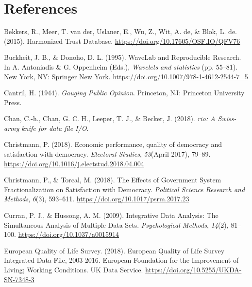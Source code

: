 \documentclass[12pt,]{article}
\begin{document}
\normalsize

\hypertarget{references}{%
\section{References}\label{references}}

\renewcommand{\baselinestretch}{1}\normalsize
\parindent 0in
\leftskip 0.2in

\parindent -0.2in

\hypertarget{refs}{}
\leavevmode\hypertarget{ref-Bekkers2015}{}%
Bekkers, R., Meer, T. van der, Uslaner, E., Wu, Z., Wit, A. de, \& Blok, L. de. (2015). Harmonized Trust Database. \url{https://doi.org/10.17605/OSF.IO/QFV76}

\leavevmode\hypertarget{ref-Buckheit1995}{}%
Buckheit, J. B., \& Donoho, D. L. (1995). WaveLab and Reproducible Research. In A. Antoniadis \& G. Oppenheim (Eds.), \emph{Wavelets and statistics} (pp. 55--81). New York, NY: Springer New York. \url{https://doi.org/10.1007/978-1-4612-2544-7_5}

\leavevmode\hypertarget{ref-Cantril1944}{}%
Cantril, H. (1944). \emph{Gauging Public Opinion}. Princeton, NJ: Princeton University Press.

\leavevmode\hypertarget{ref-rio}{}%
Chan, C.-h., Chan, G. C. H., Leeper, T. J., \& Becker, J. (2018). \emph{rio: A Swiss-army knife for data file I/O}.

\leavevmode\hypertarget{ref-Christmann2018}{}%
Christmann, P. (2018). Economic performance, quality of democracy and satisfaction with democracy. \emph{Electoral Studies}, \emph{53}(April 2017), 79--89. \url{https://doi.org/10.1016/j.electstud.2018.04.004}

\leavevmode\hypertarget{ref-Christmann2018a}{}%
Christmann, P., \& Torcal, M. (2018). The Effects of Government System Fractionalization on Satisfaction with Democracy. \emph{Political Science Research and Methods}, \emph{6}(3), 593--611. \url{https://doi.org/10.1017/psrm.2017.23}

\leavevmode\hypertarget{ref-Curran2009}{}%
Curran, P. J., \& Hussong, A. M. (2009). Integrative Data Analysis: The Simultaneous Analysis of Multiple Data Sets. \emph{Psychological Methods}, \emph{14}(2), 81--100. \url{https://doi.org/10.1037/a0015914}

\leavevmode\hypertarget{ref-EQLS2018}{}%
European Quality of Life Survey. (2018). European Quality of Life Survey Integrated Data File, 2003-2016. European Foundation for the Improvement of Living; Working Conditions. UK Data Service. \url{https://doi.org/10.5255/UKDA-SN-7348-3}
\end{document}
